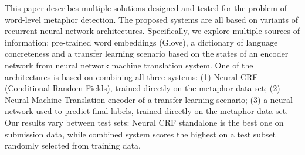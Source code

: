 This paper describes multiple solutions designed and tested for the problem of word-level metaphor detection. The proposed systems are all based on variants of recurrent neural network architectures. Specifically, we explore multiple sources of information: pre-trained word embeddings (Glove), a dictionary of language concreteness and a transfer learning scenario based on the states of an encoder network from neural network machine translation system. One of the architectures is based on combining all three systems: (1) Neural CRF (Conditional Random Fields), trained directly on the metaphor data set; (2) Neural Machine Translation encoder of a transfer learning scenario; (3) a neural network used to predict final labels, trained directly on the metaphor data set. Our results vary between test sets: Neural CRF standalone is the best one on submission data, while combined system scores the highest on a test subset randomly selected from training data.
